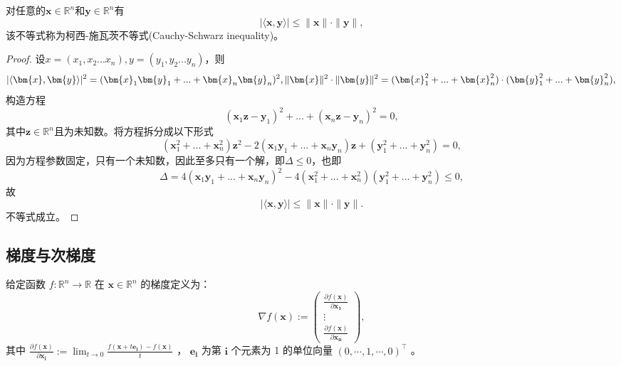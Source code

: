 \begin{theorem}[柯西-施瓦茨不等式]
    对任意的$  \bm{x} \in \mathbb{R}^{n}  $和$  \bm{y} \in \mathbb{R}^{n}  $有
    \begin{equation}
    |\langle\bm{x}, \bm{y}\rangle| \leq\|\bm{x}\| \cdot\|\bm{y}\|,
        \nonumber
    \end{equation}
    该不等式称为柯西-施瓦茨不等式(Cauchy-Schwarz inequality)\cite{2007柯西}。
    \label{thm1_4}
\end{theorem}
\begin{proof}
    设$x=(x_1,x_2...x_n),y=(y_1,y_2...y_n)$，则
    \begin{equation}
        |\langle\bm{x}, \bm{y}\rangle|^2=(\bm{x}_1\bm{y}_1+...+\bm{x}_n\bm{y}_n)^2, \\
        \|\bm{x}\|^2 \cdot\|\bm{y}\|^2=(\bm{x}_1^2+...+\bm{x}_n^2) \cdot(\bm{y}_1^2+...+\bm{y}_n^2), \\
        \nonumber
    \end{equation}
    构造方程
    \begin{equation}
        (\bm{x}_1\bm{z}-\bm{y}_1)^2+...+(\bm{x}_n\bm{z}-\bm{y}_n)^2=0,
        \nonumber
    \end{equation}
    其中$\bm{z} \in \mathbb{R}^{n}$且为未知数。将方程拆分成以下形式
    \begin{equation}
        (\bm{x}_1^2+...+\bm{x}_n^2)\bm{z}^2-2(\bm{x}_1\bm{y}_1+...+\bm{x}_n\bm{y}_n)\bm{z}+(\bm{y}_1^2+...+\bm{y}_n^2)=0,
        \nonumber
    \end{equation}
    因为方程参数固定，只有一个未知数，因此至多只有一个解，即$\Delta \leq 0$，也即
    \begin{equation}
        \Delta=4(\bm{x}_1\bm{y}_1+...+\bm{x}_n\bm{y}_n)^2-4(\bm{x}_1^2+...+\bm{x}_n^2)(\bm{y}_1^2+...+\bm{y}_n^2) \leq 0 ,
        \nonumber
    \end{equation}
    故
    \begin{equation}
        |\langle\bm{x}, \bm{y}\rangle| \leq\|\bm{x}\| \cdot\|\bm{y}\|.
        \nonumber
    \end{equation}
    不等式成立。
\end{proof}

\subsection{梯度与次梯度}
\begin{definition}[梯度]
    给定函数 $f: \mathbb{R}^{n} \rightarrow \mathbb{R}$ 在 $\bm{x} \in \mathbb{R}^{n}$ 的梯度定义为：
\begin{equation}
    \nabla f(\bm{x}):=\left(\begin{array}{c}
    \frac{\partial f(\bm{x})}{\partial \bm{x_{1}}} \\
    \vdots \\
    \frac{\partial f(\bm{x})}{\partial \bm{x_{n}}}
    \end{array}\right),
    \nonumber
\end{equation}
其中 $\frac{\partial f(\bm{x})}{\partial \bm{x_{i}}}:=\lim _{t \rightarrow 0} \frac{f\left(\bm{x}+t \bm{e_{i}}\right)-f(\bm{x})}{t}$ ， $\bm{e_{i}}$ 为第 $\bm{i}$ 个元素为 1 的单位向量 $(0, \cdots, 1, \cdots, 0)^{\top}$ 。 
\end{definition}

